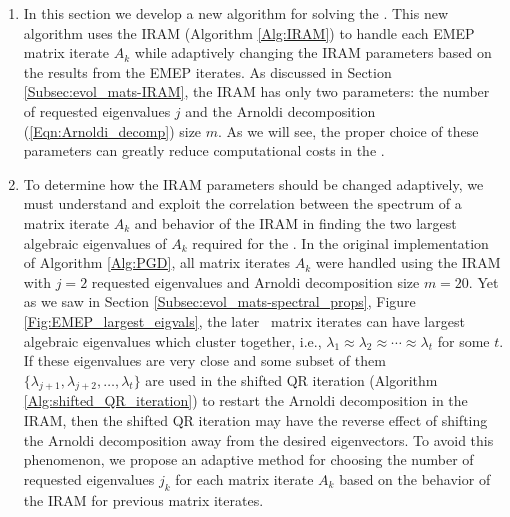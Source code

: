 \begin{enumerate}




\item


In this section we develop a new algorithm for solving the \emep.  
This new algorithm uses the IRAM (Algorithm \ref{Alg:IRAM}) to handle each EMEP matrix iterate $A_k$ while adaptively changing the IRAM parameters based on the results from the EMEP iterates.
As discussed in Section \ref{Subsec:evol_mats-IRAM}, the IRAM has only two parameters: the number of requested eigenvalues $j$ and the Arnoldi decomposition (\ref{Eqn:Arnoldi_decomp}) size $m$.
As we will see, the proper choice of these parameters can greatly reduce computational costs in the \emep.




\item

To determine how the IRAM parameters should be changed adaptively, we must understand and exploit the correlation between the spectrum of a matrix iterate $A_k$ and behavior of the IRAM in finding the two largest algebraic eigenvalues of $A_k$ required for the \emep.
In the original implementation of Algorithm \ref{Alg:PGD}, all matrix iterates $A_k$ were handled using the IRAM with $j=2$ requested eigenvalues and Arnoldi decomposition size $m=20$.
Yet as we saw in Section \ref{Subsec:evol_mats-spectral_props}, Figure \ref{Fig:EMEP_largest_eigvals}, the later \emep \ matrix iterates can have largest algebraic eigenvalues which cluster together, i.e., $\lambda_1 \approx \lambda_2 \approx  \cdots \approx \lambda_t$ for some $t$.
If these eigenvalues are very close and some subset of them $\{ \lambda_{j+1}, \lambda_{j+2}, \ldots, \lambda_t \}$ are used in the shifted QR iteration (Algorithm \ref{Alg:shifted_QR_iteration}) to restart the Arnoldi decomposition in the IRAM, then the shifted QR iteration may have the reverse effect of shifting the Arnoldi decomposition away from the desired eigenvectors.
To avoid this phenomenon, we propose an adaptive method for choosing the number of requested eigenvalues $j_k$ for each matrix iterate $A_k$ based on the behavior of the IRAM for previous matrix iterates.




\end{enumerate}
